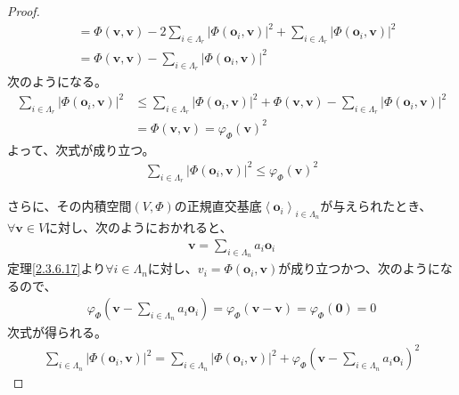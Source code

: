\documentclass[dvipdfmx]{jsarticle}
\begin{document}
\begin{proof}
\begin{align*}
&= \varPhi \left( \mathbf{v,v} \right) - 2\sum_{i \in \varLambda_{r}} \left| \varPhi \left( \mathbf{o}_{i},\mathbf{v} \right) \right|^{2} + \sum_{i \in \varLambda_{r}} \left| \varPhi \left( \mathbf{o}_{i},\mathbf{v} \right) \right|^{2}\\
&= \varPhi \left( \mathbf{v,v} \right) - \sum_{i \in \varLambda_{r}} \left| \varPhi \left( \mathbf{o}_{i},\mathbf{v} \right) \right|^{2}
\end{align*}
次のようになる。
\begin{align*}
\sum_{i \in \varLambda_{r}} \left| \varPhi \left( \mathbf{o}_{i},\mathbf{v} \right) \right|^{2} &\leq \sum_{i \in \varLambda_{r}} \left| \varPhi \left( \mathbf{o}_{i},\mathbf{v} \right) \right|^{2} + \varPhi \left( \mathbf{v,v} \right) - \sum_{i \in \varLambda_{r}} \left| \varPhi \left( \mathbf{o}_{i},\mathbf{v} \right) \right|^{2}\\
&= \varPhi \left( \mathbf{v,v} \right) = {\varphi_{\varPhi }\left( \mathbf{v} \right)}^{2}
\end{align*}
よって、次式が成り立つ。
\begin{align*}
\sum_{i \in \varLambda_{r}} \left| \varPhi \left( \mathbf{o}_{i},\mathbf{v} \right) \right|^{2} \leq {\varphi_{\varPhi }\left( \mathbf{v} \right)}^{2}
\end{align*}\par
さらに、その内積空間$(V,\varPhi )$の正規直交基底$\left\langle \mathbf{o}_{i} \right\rangle_{i \in \varLambda_{n}}$が与えられたとき、$\forall\mathbf{v} \in V$に対し、次のようにおかれると、
\begin{align*}
\mathbf{v} = \sum_{i \in \varLambda_{n}} {a_{i}\mathbf{o}_{i}}
\end{align*}
定理\ref{2.3.6.17}より$\forall i \in \varLambda_{n}$に対し、$v_{i} = \varPhi \left( \mathbf{o}_{i},\mathbf{v} \right)$が成り立つかつ、次のようになるので、
\begin{align*}
\varphi_{\varPhi }\left( \mathbf{v} - \sum_{i \in \varLambda_{n}} {a_{i}\mathbf{o}_{i}} \right) = \varphi_{\varPhi }\left( \mathbf{v} - \mathbf{v} \right) = \varphi_{\varPhi }\left( \mathbf{0} \right) = 0
\end{align*}
次式が得られる。
\begin{align*}
\sum_{i \in \varLambda_{n}} \left| \varPhi \left( \mathbf{o}_{i},\mathbf{v} \right) \right|^{2} = \sum_{i \in \varLambda_{n}} \left| \varPhi \left( \mathbf{o}_{i},\mathbf{v} \right) \right|^{2} + {\varphi_{\varPhi }\left( \mathbf{v} - \sum_{i \in \varLambda_{n}} {a_{i}\mathbf{o}_{i}} \right)}^{2}
\end{align*}

\end{proof}
\end{document}
